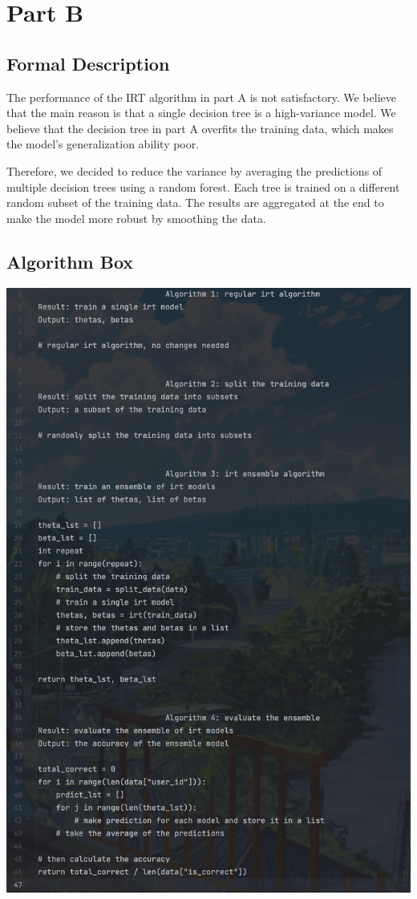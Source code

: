 \documentclass{article}
\begin{document}
\section*{Part B}

\subsection*{Formal Description}

The performance of the IRT algorithm in part A is not satisfactory. We believe that the main reason is that a single decision tree is a high-variance model. We believe that the decision tree in part A overfits the training data, which makes the model's generalization ability poor.

Therefore, we decided to reduce the variance by averaging the predictions of multiple decision trees using a random forest. Each tree is trained on a different random subset of the training data. The results are aggregated at the end to make the model more robust by smoothing the data.

\subsection*{Algorithm Box}

\includegraphics[width=0.7\linewidth]{6051723192250_.pic.jpg}
\end{document}
